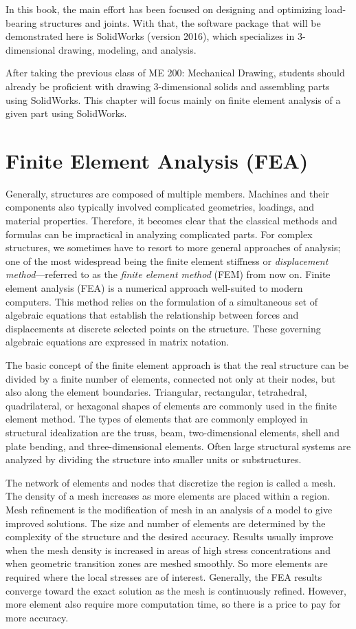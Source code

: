 \documentclass[a4paper,openany,12pt]{book}
\begin{document}
{{In this book, the main effort has been focused on designing and
optimizing load-bearing structures and joints. With that, the software
package that will be demonstrated here is SolidWorks (version 2016),
which specializes in 3-dimensional drawing, modeling, and analysis.

After taking the previous class of ME 200: Mechanical Drawing, students
should already be proficient with drawing 3-dimensional solids and
assembling parts using SolidWorks. This chapter will focus mainly on
finite element analysis of a given part using SolidWorks.

\section{Finite Element Analysis (FEA)}
\label{finite-element-analysis-fea}
Generally, structures are composed of multiple members. Machines and
their components also typically involved complicated geometries,
loadings, and material properties. Therefore, it becomes clear that the
classical methods and formulas can be impractical in analyzing
complicated parts. For complex structures, we sometimes have to resort
to more general approaches of analysis; one of the most widespread being
the finite element stiffness or \emph{displacement method}---referred to as
the \emph{finite element method} (FEM) from now on. Finite element analysis
(FEA) is a numerical approach well-suited to modern computers. This
method relies on the formulation of a simultaneous set of algebraic
equations that establish the relationship between forces and
displacements at discrete selected points on the structure. These
governing algebraic equations are expressed in matrix notation.

The basic concept of the finite element approach is that the real
structure can be divided by a finite number of elements, connected not
only at their nodes, but also along the element boundaries. Triangular,
rectangular, tetrahedral, quadrilateral, or hexagonal shapes of elements
are commonly used in the finite element method. The types of elements
that are commonly employed in structural idealization are the truss,
beam, two-dimensional elements, shell and plate bending, and
three-dimensional elements. Often large structural systems are analyzed
by dividing the structure into smaller units or substructures.

The network of elements and nodes that discretize the region is called a
mesh. The density of a mesh increases as more elements are placed within
a region. Mesh refinement is the modification of mesh in an analysis of
a model to give improved solutions. The size and number of elements are
determined by the complexity of the structure and the desired accuracy.
Results usually improve when the mesh density is increased in areas of
high stress concentrations and when geometric transition zones are
meshed smoothly. So more elements are required where the local stresses
are of interest. Generally, the FEA results converge toward the exact
solution as the mesh is continuously refined. However, more element also
require more computation time, so there is a price to pay for more
accuracy.

}}
\end{document}
